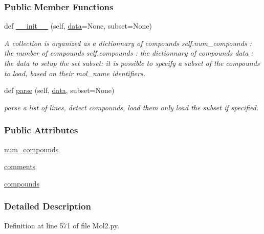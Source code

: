 \subsubsection*{Public Member Functions}
\begin{DoxyCompactItemize}
\item 
def \hyperlink{classsrc_1_1Mol2_1_1mol2__set_a9228a97620cf4de034a2102d83c83a07}{\+\_\+\+\_\+init\+\_\+\+\_\+} (self, \hyperlink{namespacesrc_1_1Mol2_a12bf18db47042b1704de5e1fb05b2ade}{data}=None, subset=None)
\begin{DoxyCompactList}\small\item\em A collection is organized as a dictionnary of compounds self.\+num\+\_\+compounds \+: the number of compounds self.\+compounds \+: the dictionnary of compounds data \+: the data to setup the set subset\+: it is possible to specify a subset of the compounds to load, based on their mol\+\_\+name identifiers. \end{DoxyCompactList}\item 
def \hyperlink{classsrc_1_1Mol2_1_1mol2__set_a3f0f1e1c4b0aa522161e0aeeda3d08d7}{parse} (self, \hyperlink{namespacesrc_1_1Mol2_a12bf18db47042b1704de5e1fb05b2ade}{data}, subset=None)
\begin{DoxyCompactList}\small\item\em parse a list of lines, detect compounds, load them only load the subset if specified. \end{DoxyCompactList}\end{DoxyCompactItemize}
\subsubsection*{Public Attributes}
\begin{DoxyCompactItemize}
\item 
\hyperlink{classsrc_1_1Mol2_1_1mol2__set_a5e0f5dcab5439777f02835e30073c3d6}{num\+\_\+compounds}
\item 
\hyperlink{classsrc_1_1Mol2_1_1mol2__set_a738966bae75c6d835324bdcc6e0b503f}{comments}
\item 
\hyperlink{classsrc_1_1Mol2_1_1mol2__set_abe7f696716f52fafdbefe5cb8ef7ecfe}{compounds}
\end{DoxyCompactItemize}


\subsubsection{Detailed Description}


Definition at line 571 of file Mol2.\+py.



